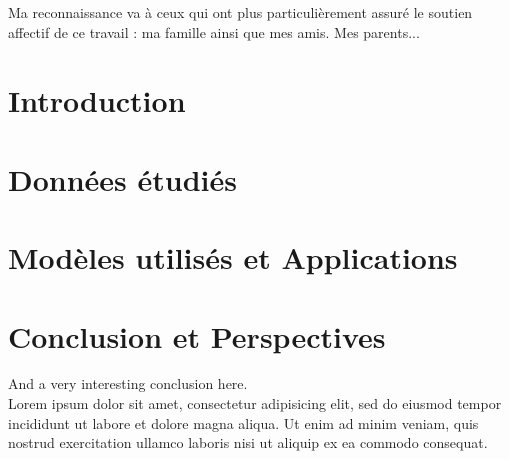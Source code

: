 \documentclass[a4paper, oneside, 12pt, final]{extreport}
\begin{document}

Ma reconnaissance va à ceux qui ont plus particulièrement assuré le soutien affectif de ce travail : ma famille ainsi que mes amis. Mes parents...




\tableofcontents

\listoffigures
\listoftables
\listofalgorithms
{}
\cleardoublepage

\newpage
{}
\chapter*{Introduction}
\label{chap:general_intorduction}



\chapter{Données étudiés}%
\label{chap:chapterone}


\chapter{Modèles utilisés et Applications}
\label{chap:2}



\chapter*{Conclusion et Perspectives}
\label{chap:conclusion}
%
And a very interesting conclusion here\@. ~\\
Lorem ipsum dolor sit amet, consectetur adipisicing elit, sed do eiusmod
tempor incididunt ut labore et dolore magna aliqua. Ut enim ad minim veniam,
quis nostrud exercitation ullamco laboris nisi ut aliquip ex ea commodo
consequat.
\end{document}
